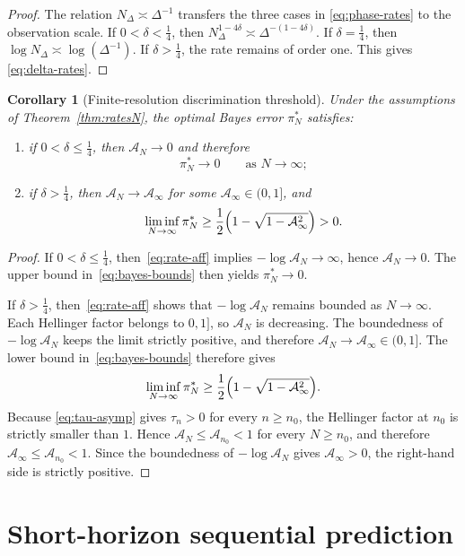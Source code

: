 \documentclass[11pt,a4paper]{amsart}
\theoremstyle{plain}
\newtheorem{corollary}[theorem]{Corollary}
\theoremstyle{definition}
\theoremstyle{remark}
\newcommand{\Acal}{\mathcal A}
\begin{document}
\begin{proof}
The relation \(N_\Delta\asymp \Delta^{-1}\) transfers the three cases in
\eqref{eq:phase-rates} to the observation scale.  If \(0<\delta<\tfrac14\), then
\(N_\Delta^{1-4\delta}\asymp \Delta^{-(1-4\delta)}\).  If \(\delta=\tfrac14\), then
\(\log N_\Delta\asymp \log(\Delta^{-1})\).  If \(\delta>\tfrac14\), the rate remains of order
one.  This gives \eqref{eq:delta-rates}.
\end{proof}

\begin{corollary}[Finite-resolution discrimination threshold]\label{cor:bayes}
Under the assumptions of Theorem~\ref{thm:ratesN}, the optimal Bayes error
$\pi_N^\ast$ satisfies:
\begin{enumerate}[label=(\roman*)]
\item if $0<\delta\le\tfrac14$, then $\Acal_N\to0$ and therefore
\[
\pi_N^\ast \to 0
\qquad\text{as }N\to\infty;
\]
\item if $\delta>\tfrac14$, then $\Acal_N\to \Acal_\infty$ for some
$\Acal_\infty\in(0,1]$, and
\[
\liminf_{N\to\infty}\pi_N^\ast
\ge
\frac12\Bigl(1-\sqrt{1-\Acal_\infty^2}\Bigr)
>0.
\]
\end{enumerate}
\end{corollary}

\begin{proof}
If $0<\delta\le\tfrac14$, then~\eqref{eq:rate-aff} implies
$-\log\Acal_N\to\infty$, hence $\Acal_N\to0$. The upper bound in~\eqref{eq:bayes-bounds}
then yields $\pi_N^\ast\to0$.

If $\delta>\tfrac14$, then~\eqref{eq:rate-aff} shows that $-\log \Acal_N$ remains bounded
as $N\to\infty$. Each Hellinger factor belongs to \(0,1]\), so \(\Acal_N\) is decreasing.
The boundedness of \(-\log \Acal_N\) keeps the limit strictly positive, and therefore
\(\Acal_N\to\Acal_\infty\in(0,1]\). The lower bound in~\eqref{eq:bayes-bounds} therefore gives
\[
\liminf_{N\to\infty}\pi_N^\ast
\ge
\frac12\Bigl(1-\sqrt{1-\Acal_\infty^2}\Bigr).
\]
Because \eqref{eq:tau-asymp} gives $\tau_n>0$ for every $n\ge n_0$, the Hellinger factor at
$n_0$ is strictly smaller than $1$. Hence $\Acal_N\le \Acal_{n_0}<1$ for every
$N\ge n_0$, and therefore $\Acal_\infty\le \Acal_{n_0}<1$. Since the boundedness of
$-\log\Acal_N$ gives $\Acal_\infty>0$, the right-hand side is strictly positive.
\end{proof}

\section{Short-horizon sequential prediction}\label{sec:prediction}
\end{document}
